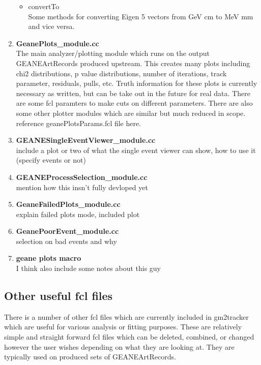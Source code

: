 \documentclass{article}
\begin{document}
\begin{enumerate}
\begin{itemize}
          \item{convertTo} \\
          Some methods for converting Eigen 5 vectors from GeV cm to MeV mm and vice versa.

        \end{itemize}

      \item{\bf{GeanePlots\_module.cc}} \\
      The main analyzer/plotting module which runs on the output GEANEArtRecords produced upstream. This creates many plots including chi2 distributions, p value distributions, number of iterations, track parameter, residuals, pulls, etc. Truth information for these plots is currently necessary as written, but can be take out in the future for real data. There are some fcl paramters to make cuts on different parameters. There are also some other plotter modules which are similar but much reduced in scope. reference geanePlotsParams.fcl file here.

      \item{\bf{GEANESingleEventViewer\_module.cc}} \\
      include a plot or two of what the single event viewer can show, how to use it (specify events or not)

      \item{\bf{GEANEProcessSelection\_module.cc}} \\
      mention how this insn't fully devloped yet

      \item{\bf{GeaneFailedPlots\_module.cc}} \\
      explain failed plots mode, included plot

      \item{\bf{GeanePoorEvent\_module.cc}} \\
      selection on bad events and why

      \item{\bf{geane plots macro}} \\
      I think also include some notes about this guy

    \end{enumerate}


  \subsection{Other useful fcl files}

    There is a number of other fcl files which are currently included in gm2tracker which are useful for various analysis or fitting purposes. These are relatively simple and straight forward fcl files which can be deleted, combined, or changed however the user wishes depending on what they are looking at. They are typically used on produced sets of GEANEArtRecords.
\end{document}
